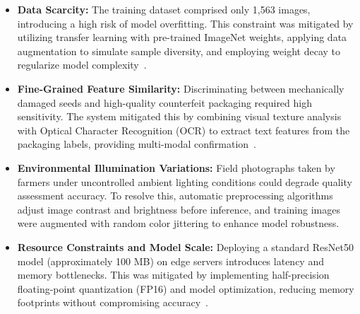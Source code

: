\begin{itemize}
    \item \textbf{Data Scarcity:} The training dataset comprised only 1,563 images, introducing a high risk of model overfitting. This constraint was mitigated by utilizing transfer learning with pre-trained ImageNet weights, applying data augmentation to simulate sample diversity, and employing weight decay to regularize model complexity~\cite{krizhevsky2012imagenet, loshchilov2019adamw}.
    
    \item \textbf{Fine-Grained Feature Similarity:} Discriminating between mechanically damaged seeds and high-quality counterfeit packaging required high sensitivity. The system mitigated this by combining visual texture analysis with Optical Character Recognition (OCR) to extract text features from the packaging labels, providing multi-modal confirmation~\cite{mohanty2016}.
    
    \item \textbf{Environmental Illumination Variations:} Field photographs taken by farmers under uncontrolled ambient lighting conditions could degrade quality assessment accuracy. To resolve this, automatic preprocessing algorithms adjust image contrast and brightness before inference, and training images were augmented with random color jittering to enhance model robustness.
    
    \item \textbf{Resource Constraints and Model Scale:} Deploying a standard ResNet50 model (approximately 100 MB) on edge servers introduces latency and memory bottlenecks. This was mitigated by implementing half-precision floating-point quantization (FP16) and model optimization, reducing memory footprints without compromising accuracy~\cite{pytorch2019}.
\end{itemize}
